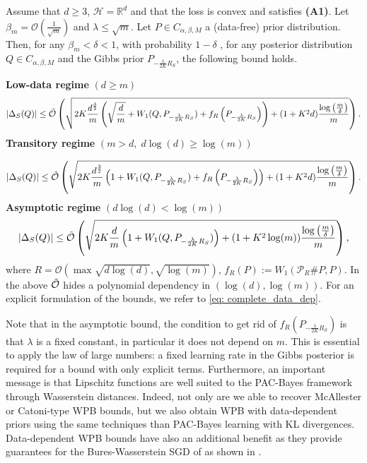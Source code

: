 \begin{theorem}
\label{th: data_dep}
Assume that $d\geq 3$, $\mathcal{H}= \mathbb{R}^d$ and that the loss is convex and satisfies \textbf{(A1)}. Let $\beta_m= \mathcal{O}(\frac{1}{\sqrt{m}})$ and $\lambda \leq \sqrt{m}$.
Let $P\in C_{\alpha,\beta,M}$ a (data-free) prior distribution. Then, for any $\beta_m<\delta<1$, with probability $1-\delta$ , for any posterior distribution $Q\in C_{\alpha,\beta,M}$ and the Gibbs prior $P_{-\frac{\lambda}{2K} R_S}$, the following bound holds.

\noindent\textbf{Low-data regime} $(d\geq m)$
\begin{align*}
|\Delta_S(Q)|  \leq\Tilde{\mathcal{O}}\left( \sqrt{2K\frac{d^{\frac{3}{2}}}{m}\left(\sqrt{\frac{d}{m}}+  W_1(Q,P_{-\frac{\lambda}{2K}R_S}) +f_R\left(P_{-\frac{\lambda}{2K}R_S}\right)\right)+(1+K^2d)\frac{\log\left( \frac{m}{\delta} \right)}{m}}   \right).
\end{align*}
\textbf{Transitory regime} $(m>d,\; d\log(d)\geq \log(m))$

\begin{align*}
|\Delta_S(Q)|  \leq\Tilde{\mathcal{O}}\left( \sqrt{2K\frac{d^{\frac{3}{2}}}{m}\left(1+ W_1(Q,P_{-\frac{\lambda}{2K}R_S})+ f_R\left(P_{-\frac{\lambda}{2K}R_S}\right)\right)+(1+K^2d)\frac{\log\left( \frac{m}{\delta} \right)}{m}}   \right).
\end{align*}
\textbf{Asymptotic regime} $(d\log(d)< \log(m))$
\begin{align*}
|\Delta_S(Q)|  \leq\Tilde{\mathcal{O}}\left( \sqrt{2K\frac{d}{m}\left(1 + W_1(Q,P_{-\frac{\lambda}{2K}R_S})\right)+(1+K^2\log(m))\frac{\log\left( \frac{m}{\delta} \right)}{m}}   \right),
\end{align*}
where $R= \mathcal{O}\left( \max \sqrt{d\log(d)}, \sqrt{\log(m)}   \right)$, $f_R(P) := W_1(\mathcal{P}_R\#P,P)$.
In the above $\Tilde{\mathcal{O}}$ hides a polynomial dependency in $(\log(d),\log(m))$. For an explicit formulation of the bounds, we refer to \eqref{eq: complete_data_dep}.
\end{theorem}
Note that in the asymptotic bound, the condition to get rid of $f_R(P_{-\frac{\lambda}{2K}R_S})$ is that $\lambda$ is a fixed constant, in particular it does not depend on $m$. This is essential to apply the law of large numbers: a fixed learning rate in the Gibbs posterior is required for a bound with only explicit terms.
Furthermore, an important message is that Lipschitz functions are well suited to the PAC-Bayes framework through Wasserstein distances. Indeed, not only are we able to recover McAllester or Catoni-type WPB bounds, but we also obtain WPB with data-dependent priors using the same techniques than PAC-Bayes learning with KL divergences. Data-dependent WPB bounds have also an additional benefit as they provide guarantees for the Bures-Wasserstein SGD of \citet{lambert2022variational} as shown in .


